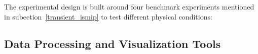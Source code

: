 The experimental design is built around four benchmark experiments mentioned in subection~\ref{transient_ismip} to test different physical conditions:















\subsection{Data Processing and Visualization Tools}\label{dataviz}


